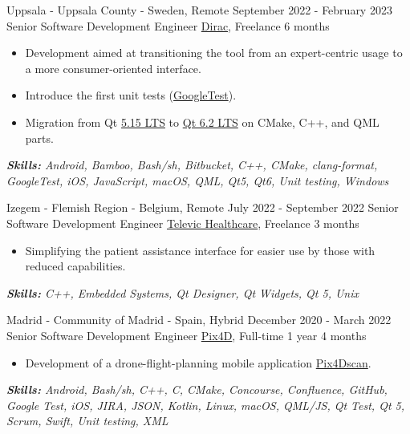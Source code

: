 \documentclass[11pt,a4paper,roman]{moderncv}
\begin{document}
\cventry
{Uppsala - Uppsala County - Sweden, Remote}
{September 2022 - February 2023}
{Senior Software Development Engineer}
{\href{https://www.dirac.com}{Dirac}, Freelance}
{6 months}
{}
{
\begin{itemize}
	\item Development aimed at transitioning the tool from an expert-centric usage to a more consumer-oriented interface.
	\item Introduce the first unit tests (\href{https://google.github.io/googletest/}{GoogleTest}).
	\item Migration from Qt \href{https://doc.qt.io/qt-5/}{5.15 LTS} to \href{https://doc.qt.io/qt-6.2/}{Qt 6.2 LTS} on CMake, C++, and QML parts.
\end{itemize}

{\textcolor{color2}{\textit{\textbf{Skills:}
	Android,
	Bamboo,
	Bash/sh,
	Bitbucket,
	C++,
	CMake,
	clang-format,
	GoogleTest,
	iOS,
	JavaScript,
	macOS,
	QML,
   Qt5,
	Qt6,
	Unit testing,
	Windows
	\newline
}}}}


\cventry
{Izegem - Flemish Region - Belgium, Remote}
{July 2022 - September 2022}
{Senior Software Development Engineer}
{\href{https://www.televic.com/en/healthcare}{Televic Healthcare}, Freelance}
{3 months}
{}
{
\begin{itemize}
	\item Simplifying the patient assistance interface for easier use by those with reduced capabilities.
\end{itemize}
{\textcolor{color2}{\textit{\textbf{Skills:}
	C++,
	Embedded Systems,
	Qt Designer,
	Qt Widgets,
	Qt 5,
	Unix
	\newline
}}}}


\cventry
{Madrid - Community of Madrid - Spain, Hybrid}
{December 2020 - March 2022}
{Senior Software Development Engineer}
{\href{https://www.pix4d.com}{Pix4D}, Full-time}
{1 year 4 months}
{}
{
\begin{itemize}
	\item Development of a drone-flight-planning mobile application \href{https://www.pix4d.com/es/producto/pix4dscan}{Pix4Dscan}.
\end{itemize}
{\textcolor{color2}{\textit{\textbf{Skills:}
	Android,
	Bash/sh,
	C++,
	C,
	CMake,
	Concourse,
	Confluence,
	GitHub,
	Google Test,
	iOS,
	JIRA,
	JSON,
	Kotlin,
	Linux,
	macOS,
	QML/JS,
	Qt Test,
	Qt 5,
	Scrum,
	Swift,
	Unit testing,
	XML
	\newline
}}}}
\end{document}
